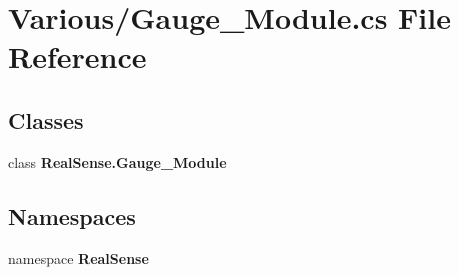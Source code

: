 \section{Various/\+Gauge\+\_\+\+Module.cs File Reference}
\label{_gauge___module_8cs}
\subsection*{Classes}
\begin{DoxyCompactItemize}
\item 
class \textbf{ Real\+Sense.\+Gauge\+\_\+\+Module}
\end{DoxyCompactItemize}
\subsection*{Namespaces}
\begin{DoxyCompactItemize}
\item 
namespace \textbf{ Real\+Sense}
\end{DoxyCompactItemize}
